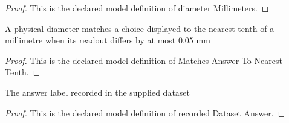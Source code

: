 \begin{proof}
  This is the declared model definition of diameter Millimeters.
\end{proof}
\begin{definition}
  \label{def:physics:phyx-mini-0106:phyxminiproblems-problemphyxmini0106-matchesanswertonearesttenth}
  A physical diameter matches a choice displayed to the nearest tenth of a millimetre when its readout differs by at most 0.05 mm
\end{definition}
\begin{proof}
  This is the declared model definition of Matches Answer To Nearest Tenth.
\end{proof}
\begin{definition}
  \label{def:physics:phyx-mini-0106:phyxminiproblems-problemphyxmini0106-recordeddatasetanswer}
  The answer label recorded in the supplied dataset
\end{definition}
\begin{proof}
  This is the declared model definition of recorded Dataset Answer.
\end{proof}
